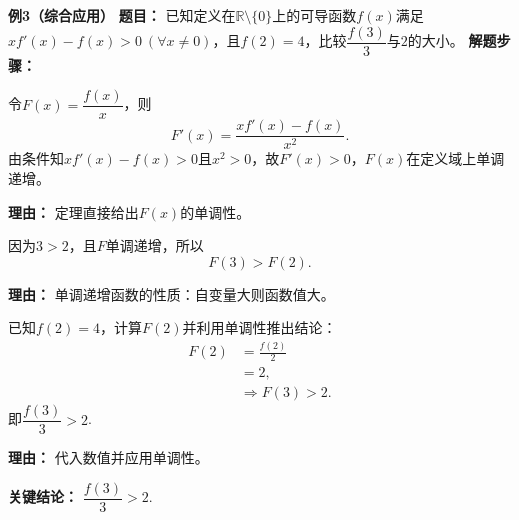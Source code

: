 \begin{examplebox}
	\medskip
	\textbf{\textcolor{CExample}{例3（综合应用）}}
	\textbf{\textcolor{CExample}{题目：}}
	已知定义在$\mathbb{R}\setminus\{0\}$上的可导函数$f(x)$满足$x f'(x)-f(x)>0\ (\forall x\neq0)$，且$f(2)=4$，比较$\dfrac{f(3)}{3}$与$2$的大小。
	\textbf{\textcolor{CExample}{解题步骤：}}
	\begin{description}[style=nextline, leftmargin=2.8em, labelsep=0.5em, itemsep=0.45em]
		\item[\textbf{第一步（构造函数判单调）：}]
			令$F(x)=\dfrac{f(x)}{x}$，则
			\[
				F'(x)=\frac{x f'(x)-f(x)}{x^{2}}.
			\]
			由条件知$x f'(x)-f(x)>0$且$x^{2}>0$，故$F'(x)>0$，$F(x)$在定义域上单调递增。
			\par\textbf{理由：} 定理直接给出$F(x)$的单调性。
		\item[\textbf{第二步（应用单调性比较）：}]
			因为$3>2$，且$F$单调递增，所以
			\[
				F(3)>F(2).
			\]
			\par\textbf{理由：} 单调递增函数的性质：自变量大则函数值大。
		\item[\textbf{第三步（代入已知数值）：}]
			已知$f(2)=4$，计算$F(2)$并利用单调性推出结论：
			\[
				\begin{aligned}
					F(2) &= \frac{f(2)}{2} \\ &= 2, \\ &\Rightarrow F(3) > 2.
			\end{aligned}
			\]
			即$\dfrac{f(3)}{3}>2$.
			\par\textbf{理由：} 代入数值并应用单调性。
	\end{description}
	\textbf{\textcolor{CExample}{关键结论：}}
	$\dfrac{f(3)}{3}>2$.
\end{examplebox}
